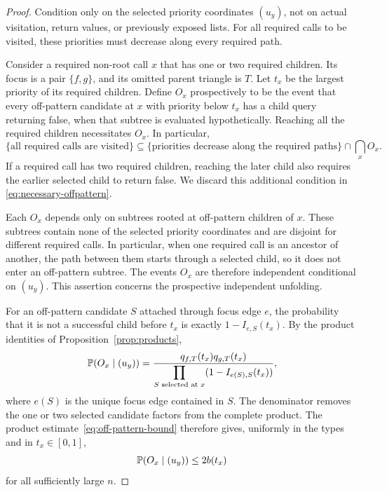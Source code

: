 \begin{proof}
Condition only on the selected priority coordinates $(u_y)$, not on
actual visitation, return values, or previously exposed lists. For all
required calls to be visited, these priorities must decrease along every
required path.

Consider a required non-root call $x$ that has one or two required
children. Its focus is a pair $\{f,g\}$, and its omitted parent triangle
is $T$. Let $t_x$ be the largest priority of its required children.
Define $O_x$ prospectively to be the event that every off-pattern
candidate at $x$ with priority below $t_x$ has a child query returning
false, when that subtree is evaluated hypothetically. Reaching all the
required children necessitates $O_x$. In particular,
\begin{equation}\label{eq:necessary-offpattern}
 \{\text{all required calls are visited}\}
 \subseteq
 \{\text{priorities decrease along the required paths}\}
 \cap\bigcap_x O_x.
\end{equation}
If a required call has two required children, reaching the later child
also requires the earlier selected child to return false. We discard
this additional condition in \eqref{eq:necessary-offpattern}.

Each $O_x$ depends only on subtrees rooted at off-pattern children of
$x$. These subtrees contain none of the selected priority coordinates
and are disjoint for different required calls. In particular, when one
required call is an ancestor of another, the path between them starts
through a selected child, so it does not enter an off-pattern subtree.
The events $O_x$ are therefore independent conditional on $(u_y)$.
This assertion concerns the prospective independent unfolding.

For an off-pattern candidate $S$ attached through focus edge $e$, the
probability that it is not a successful child before $t_x$ is exactly
$1-I_{e,S}(t_x)$. By the product identities of
Proposition~\ref{prop:products},
\begin{equation}\label{eq:offpattern-product}
 \mathbb P(O_x\mid (u_y))
 =\frac{q_{f,T}(t_x)q_{g,T}(t_x)}
 {\displaystyle\prod_{S\text{ selected at }x}
       (1-I_{e(S),S}(t_x))},
\end{equation}
where $e(S)$ is the unique focus edge contained in $S$.
The denominator removes the one or two selected candidate factors from
the complete product. The product estimate~\eqref{eq:off-pattern-bound}
therefore gives, uniformly in the types and in $t_x\in[0,1]$,
\begin{equation}\label{eq:offpattern-bound}
 \mathbb P(O_x\mid (u_y))\leq 2b(t_x)
\end{equation}
for all sufficiently large $n$.


\end{proof}
